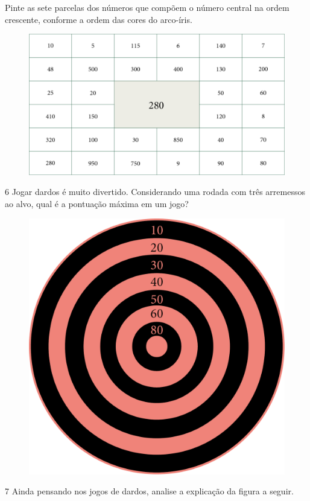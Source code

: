 
Pinte as sete parcelas dos números que compõem o número central na ordem
crescente, conforme a ordem das cores do arco-íris.

\begin{figure}[htpb!]
\includegraphics[width=\textwidth]{./media/image22.png}
\end{figure}

\pagebreak

\num{6} Jogar dardos é muito divertido. Considerando uma rodada com três arremessos ao alvo, qual é a pontuação máxima em um jogo?

\begin{figure}[htpb!]
\centering
\includegraphics[width=.4\textwidth]{./media/image23.png}
\end{figure}


\num{7} Ainda pensando nos jogos de dardos, analise a explicação da figura a seguir.

